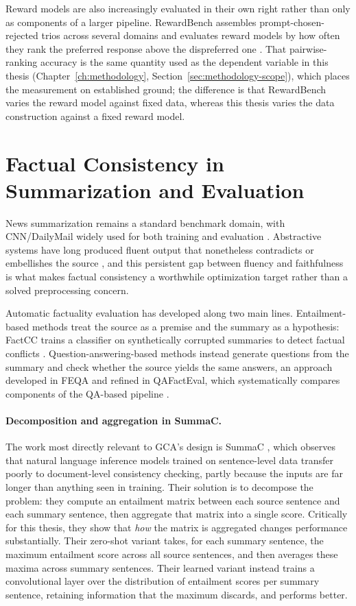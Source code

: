 Reward models are also increasingly evaluated in their own right rather than only
as components of a larger pipeline. RewardBench assembles prompt-chosen-rejected
trios across several domains and evaluates reward models by how often they rank
the preferred response above the dispreferred one
\citep{lambert2024rewardbench}. That pairwise-ranking accuracy is the same
quantity used as the dependent variable in this thesis
(Chapter~\ref{ch:methodology}, Section~\ref{sec:methodology-scope}), which places
the measurement on established ground; the difference is that RewardBench varies
the reward model against fixed data, whereas this thesis varies the data
construction against a fixed reward model.

\section{Factual Consistency in Summarization and Evaluation}
\label{sec:rw-factual-eval}

News summarization remains a standard benchmark domain, with CNN/DailyMail widely
used for both training and evaluation \citep{hermann2015teaching,
nallapati2016abstractive}. Abstractive systems have long produced fluent output
that nonetheless contradicts or embellishes the source \citep{see2017get}, and this
persistent gap between fluency and faithfulness is what makes factual consistency
a worthwhile optimization target rather than a solved preprocessing concern.

Automatic factuality evaluation has developed along two main lines. Entailment-based
methods treat the source as a premise and the summary as a hypothesis: FactCC
trains a classifier on synthetically corrupted summaries to detect factual
conflicts \citep{kryscinski2020evaluating}. Question-answering-based methods
instead generate questions from the summary and check whether the source yields
the same answers, an approach developed in FEQA \citep{durmus2020feqa} and refined
in QAFactEval, which systematically compares components of the QA-based pipeline
\citep{fabbri2022qafacteval}.

\paragraph{Decomposition and aggregation in SummaC.} The work most directly
relevant to GCA's design is SummaC \citep{laban2022summac}, which observes that
natural language inference models trained on sentence-level data transfer poorly
to document-level consistency checking, partly because the inputs are far longer
than anything seen in training. Their solution is to decompose the problem: they
compute an entailment matrix between each source sentence and each summary
sentence, then aggregate that matrix into a single score. Critically for this
thesis, they show that \emph{how} the matrix is aggregated changes performance
substantially. Their zero-shot variant takes, for each summary sentence, the
maximum entailment score across all source sentences, and then averages these
maxima across summary sentences. Their learned variant instead trains a
convolutional layer over the distribution of entailment scores per summary
sentence, retaining information that the maximum discards, and performs better.


